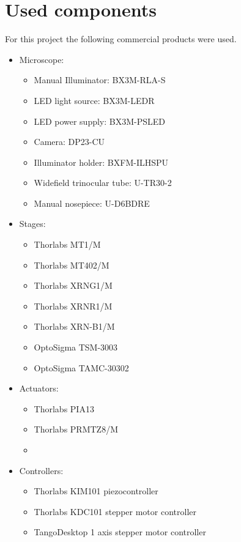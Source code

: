 \documentclass[10pt]{article}
\begin{document}
\section{Used components}
\label{ap:used_components}
For this project the following commercial products were used.
\begin{itemize}[noitemsep]
  \item Microscope:
  \begin{itemize}[noitemsep]
    \item Manual Illuminator: BX3M-RLA-S
    \item LED light source: BX3M-LEDR 
    \item LED power supply:  BX3M-PSLED
    \item Camera: DP23-CU
    \item Illuminator holder: BXFM-ILHSPU
    \item Widefield trinocular tube: U-TR30-2
    \item Manual nosepiece: U-D6BDRE
  \end{itemize}
  \item Stages:
  \begin{itemize}[noitemsep]
    \item Thorlabs MT1/M  \cite{ThorlabsMT11}
    \item Thorlabs MT402/M \cite{ThorlabsMT402RightAngle}
    \item Thorlabs XRNG1/M \cite{ThorlabsXRNG1QuickConnect}
    \item Thorlabs XRNR1/M \cite{ThorlabsXRNR1O56}
    \item Thorlabs XRN-B1/M \cite{ThorlabsXRNB1Base}
    \item OptoSigma TSM-3003
    \item OptoSigma TAMC-30302
  \end{itemize}
  \item Actuators:
  \begin{itemize}[noitemsep]
    \item Thorlabs PIA13
    \item Thorlabs PRMTZ8/M
    \item {}
  \end{itemize}
  \item Controllers:
  \begin{itemize}[noitemsep]
    \item Thorlabs KIM101 piezocontroller
    \item Thorlabs KDC101 stepper motor controller
    \item TangoDesktop 1 axis stepper motor controller
  \end{itemize}
\end{itemize}
\end{document}
